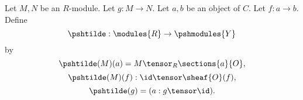 Let $M,N$ be an $R$-module.
Let $g:M \rightarrow N$.
Let $a,b$ be an object of $C$.
Let $f:a \rightarrow b$.
Define 
\[\pshtilde: \modules{R} \rightarrow \pshmodules{Y}\]
by
\[\pshtilde(M)(a) = M \tensor_R \sections{a}{O} ,\]
\[\pshtilde(M)(f): \id \tensor \sheaf{O}(f) ,\]
\[\pshtilde(g) = (a: g \tensor \id ).\]